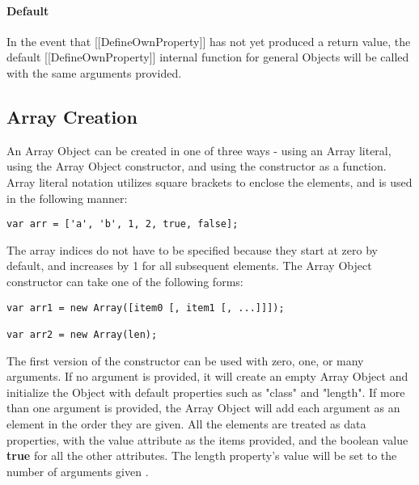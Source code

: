 \documentclass[a4paper,11pt,twoside]{report}
\begin{document}
\paragraph{Default}
In the event that [[DefineOwnProperty]] has not yet produced a return value, the default [[DefineOwnProperty]] internal function for general Objects will be called with the same arguments provided.

\subsection{Array Creation}\label{sec:arraycreate}
An Array Object can be created in one of three ways - using an Array literal, using the Array Object constructor, and using the constructor as a function. Array literal notation utilizes square brackets to enclose the elements, and is used in the following manner:

\begin{center}
\begin{minipage}{10cm}
\begin{lstlisting}
var arr = ['a', 'b', 1, 2, true, false];
\end{lstlisting}
\end{minipage}
\end{center}

The array indices do not have to be specified because they start at zero by default, and increases by 1 for all subsequent elements. The Array Object constructor can take one of the following forms:

\begin{center}
\begin{minipage}{10cm}
\begin{lstlisting}
var arr1 = new Array([item0 [, item1 [, ...]]]);

var arr2 = new Array(len);
\end{lstlisting}
\end{minipage}
\end{center}

The first version of the constructor can be used with zero, one, or many arguments. If no argument is provided, it will create an empty Array Object and initialize the Object with default properties such as "class" and "length". If more than one argument is provided, the Array Object will add each argument as an element in the order they are given. All the elements are treated as data properties, with the value attribute as the items provided, and the boolean value \textbf{true} for all the other attributes. The length property's value will be set to the number of arguments given \cite{EcmaScript}.
\end{document}
